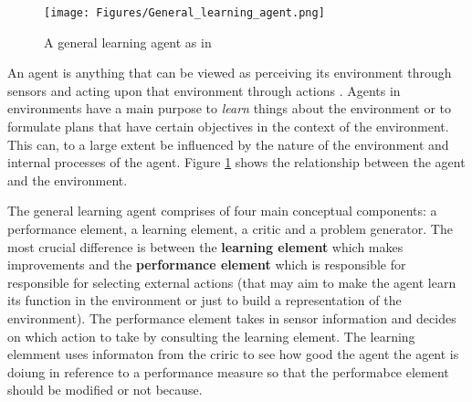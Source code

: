 \begin{figure}[H]
    \centering
    \texttt{[image: Figures/General\_learning\_agent.png]}
    \caption{A general learning agent as in \citep{russell2016artificial}}
    \label{fig:agent_environment}
\end{figure}

An agent is anything that can be viewed as perceiving its environment through sensors and acting upon that environment through actions \citep{russell2016artificial}. Agents in environments have a main purpose to \textit{learn} things about the environment or to formulate plans that have certain objectives in the context of the environment. This can, to a large extent be influenced by the nature of the environment and internal processes of the agent. Figure \ref{fig:agent_environment} shows the relationship between the agent and the environment. 

The general learning agent comprises of four main conceptual components: a performance element, a learning element, a critic and a problem generator. The most crucial difference is between the \textbf{learning element} which makes improvements and the \textbf{performance element} which is responsible for responsible for selecting external actions (that may aim to make the agent learn its function in the environment or just to build a representation of the environment). The performance element takes in sensor information and decides on which action to take by consulting the learning element. The learning elemment uses informaton from the criric to see how good the agent the agent is doiung in reference to a performance measure so that the performabce element should be modified or not because. 































